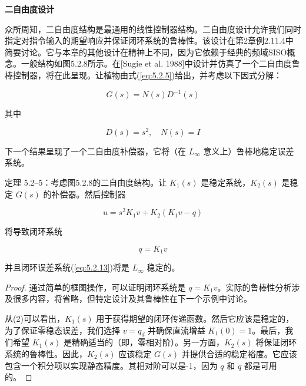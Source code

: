 \documentclass[UTF8,12pt,a4paper]{ctexart}
\begin{document}
\textbf{二自由度设计}

众所周知，二自由度结构是最通用的线性控制器结构。二自由度设计允许我们同时指定对指令输入的期望响应并保证闭环系统的鲁棒性。该设计在第2章例2.11.4中简要讨论。它与本章的其他设计在精神上不同，因为它依赖于经典的频域SISO概念。一般结构如图5.2.8所示。在[Sugie et al. 1988]中设计并仿真了一个二自由度鲁棒控制器，将在此呈现。让植物由式(\ref{eq:5.2.5})给出，并考虑以下因式分解：

\begin{equation}
G(s) = N(s)D^{-1}(s)
\end{equation}

其中

\begin{equation}\label{eq:5.2.37}
D(s) = s^2, \quad N(s) = I
\end{equation}

下一个结果呈现了一个二自由度补偿器，它将（在 $L_\infty$ 意义上）鲁棒地稳定误差系统。

\begin{theorem}\label{thm:5.2.5}
定理 5.2--5：考虑图5.2.8的二自由度结构。让 $K_1(s)$ 是稳定系统，$K_2(s)$ 是稳定 $G(s)$ 的补偿器。然后控制器

\begin{equation}
u = s^2K_1v + K_2(K_1v - q)
\end{equation}

将导致闭环系统

\begin{equation}
q = K_1v
\end{equation}

并且闭环误差系统(\ref{eq:5.2.13})将是 $L_\infty$ 稳定的。
\end{theorem}

\begin{proof}
通过简单的框图操作，可以证明闭环系统是 $q = K_1v$。实际的鲁棒性分析涉及很多内容，将省略，但特定设计及其鲁棒性在下一个示例中讨论。

从(2)可以看出，$K_1(s)$ 用于获得期望的闭环传递函数。然后它应该是稳定的，为了保证零稳态误差，我们选择 $v = q_d$ 并确保直流增益 $K_1(0) = 1$。最后，我们希望 $K_1(s)$ 是精确适当的（即，零相对阶）。另一方面，$K_2(s)$ 将保证闭环系统的鲁棒性。因此，$K_2(s)$ 应该稳定 $G(s)$ 并提供合适的稳定裕度。它应该包含一个积分项以实现静态精度。其相对阶可以是-1，因为 $q$ 和 $\dot{q}$ 都是可用的。
\end{proof}
\end{document}
